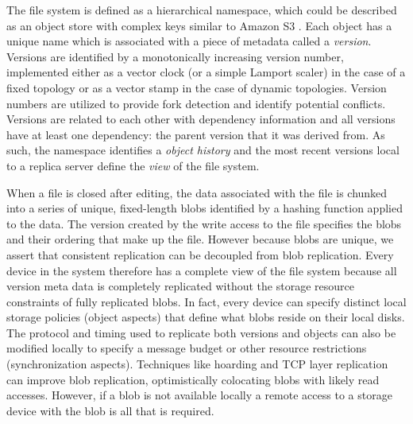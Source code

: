\documentclass{article}
\begin{document}
The file system is defined as a hierarchical namespace, which could be described as an object store with complex keys similar to Amazon S3 \cite{bermbach_eventual_2011}. Each object has a unique name which is associated with a piece of metadata called a \emph{version}. Versions are identified by a monotonically increasing version number, implemented either as a vector clock \cite{parker_detection_1983} (or a simple Lamport scaler) in the case of a fixed topology or as a vector stamp \cite{almeida_version_2002} in the case of dynamic topologies. Version numbers are utilized to provide fork detection and identify potential conflicts. Versions are related to each other with dependency information and all versions have at least one dependency: the parent version that it was derived from. As such, the namespace identifies a \emph{object history} and the most recent versions local to a replica server define the \emph{view} of the file system.

When a file is closed after editing, the data associated with the file is chunked into a series of unique, fixed-length blobs identified by a hashing function applied to the data. The version created by the write access to the file specifies the blobs and their ordering that make up the file. However because blobs are unique, we assert that consistent replication can be decoupled from blob replication. Every device in the system therefore has a complete view of the file system because all version meta data is completely replicated without the storage resource constraints of fully replicated blobs. In fact, every device can specify distinct local storage policies (object aspects) that define what blobs reside on their local disks. The protocol and timing used to replicate both versions and objects can also be modified locally to specify a message budget or other resource restrictions (synchronization aspects). Techniques like hoarding \cite{kuenning_automated_1997} and TCP layer replication \cite{venkataramani_operating_2002} can improve blob replication, optimistically colocating blobs with likely read accesses. However, if a blob is not available locally a remote access to a storage device with the blob is all that is required.
\end{document}
